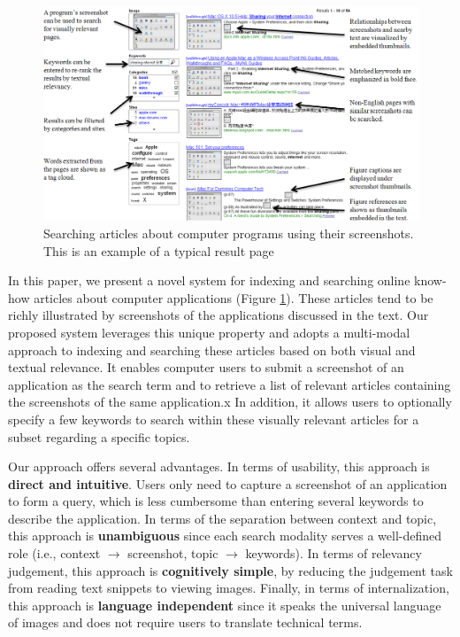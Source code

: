 \documentclass{www2010-submission}
\begin{document}

\begin{figure}
\includegraphics[width=2\columnwidth]{figure/main_result.png}
\caption{Searching articles about computer programs using
their screenshots. This is an example of a typical
result page}
\label{fig:main_result}
\end{figure}

In this paper, we present a novel system for indexing and searching
online know-how articles about computer applications (Figure
\ref{fig:main_result}).  These articles tend to be richly illustrated
by screenshots of the applications discussed in the text. Our proposed
system leverages this unique property and adopts a multi-modal
approach to indexing and searching these articles based on both visual
and textual relevance.  It enables computer users to submit a
screenshot of an application as the search term and to retrieve a list
of relevant articles containing the screenshots of the same
application.x In addition, it allows users to optionally specify a few
keywords to search within these visually relevant articles for a
subset regarding a specific topics.

Our approach offers several advantages. In terms of usability, this
approach is \textbf{direct and intuitive}. Users only need to capture a
screenshot of an application to form a query, which is less cumbersome
than entering several keywords to describe the application. In terms
of the separation between context and topic, this approach is
\textbf{unambiguous} since each search modality serves a well-defined
role (i.e., context $\rightarrow$ screenshot, topic
$\rightarrow$ keywords). In terms of relevancy judgement, this approach 
is \textbf{cognitively simple}, by reducing the judgement task from
reading text snippets to viewing images.  Finally, in terms of
internalization, this approach is \textbf{language independent} since
it speaks the universal language of images and does not require
users to translate technical terms.
\end{document}
